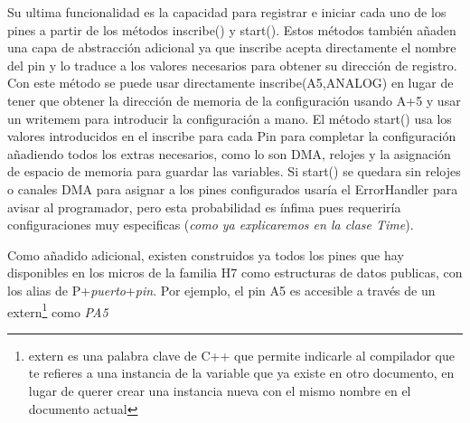 \documentclass{report}
\begin{document}
Su ultima funcionalidad es la capacidad para registrar e iniciar cada uno de los pines a partir de los métodos inscribe() y start(). Estos métodos también añaden una capa de abstracción adicional ya que inscribe acepta directamente el nombre del pin y lo traduce a los valores necesarios para obtener su dirección de registro. Con este método se puede usar directamente inscribe(A5,ANALOG) en lugar de tener que obtener la dirección de memoria de la configuración usando A+5 y usar un writemem para introducir la configuración a mano. El método start() usa los valores introducidos en el inscribe para cada Pin para completar la configuración añadiendo todos los extras necesarios, como lo son DMA, relojes y la asignación de espacio de memoria para guardar las variables. Si start() se quedara sin relojes o canales DMA para asignar a los pines configurados usaría el ErrorHandler para avisar al programador, pero esta probabilidad es ínfima pues requeriría configuraciones muy especificas (\textit{como ya explicaremos en la clase Time}). \par \vspace{0.3 cm}
Como añadido adicional, existen construidos ya todos los pines que hay disponibles en los micros de la familia H7 como estructuras de datos publicas, con los alias de P+\textit{puerto}+\textit{pin}. Por ejemplo, el pin A5 es accesible a través de un extern\footnote{extern es una palabra clave de C++ que permite indicarle al compilador que te refieres a una instancia de la variable que ya existe en otro documento, en lugar de querer crear una instancia nueva con el mismo nombre en el documento actual} como \textit{PA5} 
\end{document}
